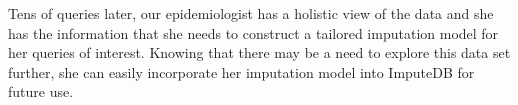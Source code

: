 Tens of queries later, our epidemiologist has a holistic view of the data and she has the information that she needs to construct a tailored imputation model for her queries of interest.
Knowing that there may be a need to explore this data set further, she can easily incorporate her imputation model into ImputeDB for future use.

%




